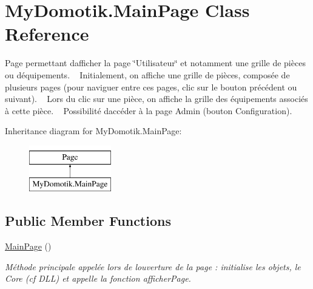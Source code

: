 \hypertarget{class_my_domotik_1_1_main_page}{}\section{My\+Domotik.\+Main\+Page Class Reference}
\label{class_my_domotik_1_1_main_page}


Page permettant d\textquotesingle{}afficher la page \char`\"{}\+Utilisateur\char`\"{} et notamment une grille de pièces ou d\textquotesingle{}équipements. ~\newline
Initialement, on affiche une grille de pièces, composée de plusieurs pages (pour naviguer entre ces pages, clic sur le bouton précédent ou suivant). ~\newline
Lors du clic sur une pièce, on affiche la grille des équipements associés à cette pièce. ~\newline
Possibilité d\textquotesingle{}accéder à la page Admin (bouton Configuration).  


Inheritance diagram for My\+Domotik.\+Main\+Page\+:\begin{figure}[H]
\begin{center}
\leavevmode
\includegraphics[height=2.000000cm]{class_my_domotik_1_1_main_page}
\end{center}
\end{figure}
\subsection*{Public Member Functions}
\begin{DoxyCompactItemize}
\item 
\hyperlink{class_my_domotik_1_1_main_page_a947aea957df3eb3208f574d7f8da3625}{Main\+Page} ()
\begin{DoxyCompactList}\small\item\em Méthode principale appelée lors de l\textquotesingle{}ouverture de la page \+: initialise les objets, le Core (cf D\+LL) et appelle la fonction afficher\+Page. \end{DoxyCompactList}\end{DoxyCompactItemize}


